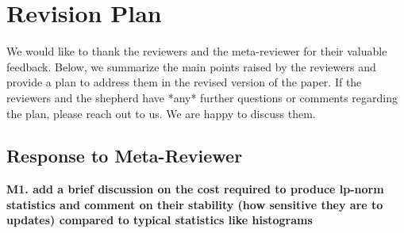     \section*{Revision Plan}

We would like to thank the reviewers and the meta-reviewer for their valuable feedback. Below, we summarize the main points raised by the reviewers and provide a plan to address them in the revised version of the paper. If the reviewers and the shepherd have *any* further questions or comments regarding the plan, please reach out to us. We are happy to discuss them. 

\subsection*{Response to Meta-Reviewer}

\textbf{
M1. add a brief discussion on the cost required to produce lp-norm statistics and comment on their stability (how sensitive they are to updates) compared to typical statistics like histograms
}

